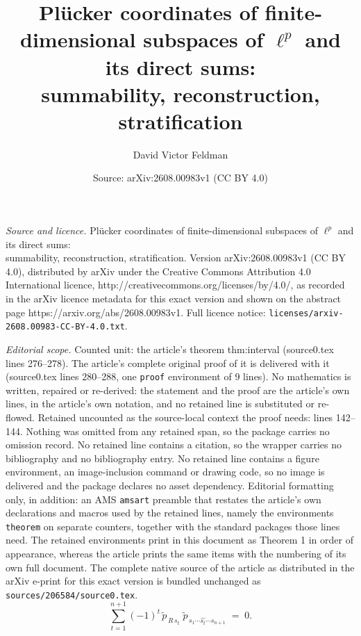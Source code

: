 \documentclass[10pt,a4paper]{amsart}
\title{Pl\"ucker coordinates of finite-dimensional subspaces of $\ell^p$ and its direct sums:\\ summability, reconstruction, stratification}
\author{David Victor Feldman}
\date{Source: arXiv:2608.00983v1 (CC BY 4.0)}
\begin{document}
\maketitle

\noindent\emph{Source and licence.} Pl\"ucker coordinates of finite-dimensional subspaces of $\ell^p$ and its direct sums:\\ summability, reconstruction, stratification. Version arXiv:2608.00983v1 (CC BY 4.0), distributed by arXiv under the Creative Commons Attribution 4.0 International licence, http://creativecommons.org/licenses/by/4.0/, as recorded in the arXiv licence metadata for this exact version and shown on the abstract page https://arxiv.org/abs/2608.00983v1. Full licence notice: \texttt{licenses/arxiv-2608.00983-CC-BY-4.0.txt}.\par\smallskip

\noindent\textit{Editorial scope.} Counted unit: the article's theorem thm:interval (source0.tex lines 276--278). The article's complete original proof of it is delivered with it (source0.tex lines 280--288, one \texttt{proof} environment of 9 lines). No mathematics is written, repaired or re-derived: the statement and the proof are the article's own lines, in the article's own notation, and no retained line is substituted or re-flowed.  Retained uncounted as the source-local context the proof needs: lines 142--144.  Nothing was omitted from any retained span, so the package carries no omission record.  No retained line contains a citation, so the wrapper carries no bibliography and no bibliography entry.  No retained line contains a figure environment, an image-inclusion command or drawing code, so no image is delivered and the package declares no asset dependency.  Editorial formatting only, in addition: an AMS \texttt{amsart} preamble that restates the article's own declarations and macros used by the retained lines, namely the environments \texttt{theorem} on separate counters, together with the standard packages those lines need.  The retained environments print in this document as Theorem 1 in order of appearance, whereas the article prints the same items with the numbering of its own full document.  The complete native source of the article as distributed in the arXiv e-print for this exact version is bundled unchanged as \texttt{sources/206584/source0.tex}.
\begin{equation}\label{eq:plucker}
\sum_{t=1}^{n+1}(-1)^t\,\tilde p_{\,R\,s_t}\;\tilde p_{\,s_1\cdots \widehat{s_t}\cdots s_{n+1}}\;=\;0 .
\end{equation}
\end{document}
